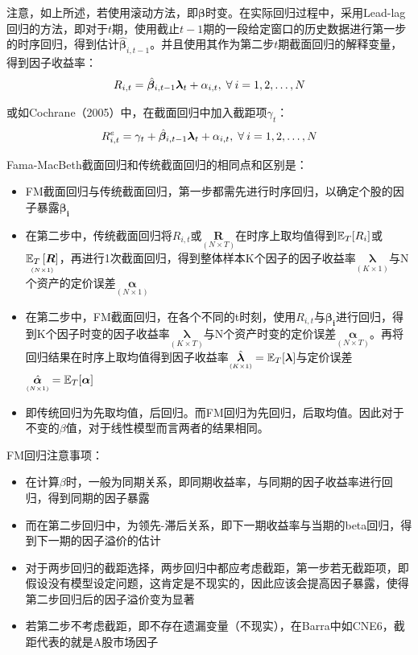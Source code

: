\documentclass[11pt]{article}
\begin{document}
注意，如上所述，若使用滚动方法，即$\bm{\beta}$时变。在实际回归过程中，采用Lead-lag回归的方法，即对于$t$期，使用截止$t-1$期的一段给定窗口的历史数据进行第一步的时序回归，得到估计$\hat{\bm{\beta}}_{i,t-1}$。并且使用其作为第二步$t$期截面回归的解释变量，得到因子收益率：
\begin{equation*}
    R_{i,t} = \hat{\bm{\beta}}_{i,t-1} \bm{\lambda}_t + \alpha_{i,t} \ilsep \forall i=1,2,\dots,N
\end{equation*}

或如Cochrane（2005）中，在截面回归中加入截距项$\gamma_t$：
\begin{equation*}
    R_{i,t}^{e} = \gamma_t + \hat{\bm{\beta}}_{i,t-1} \bm{\lambda}_t + \alpha_{i,t} \ilsep \forall i=1,2,\dots,N
\end{equation*}

Fama-MacBeth截面回归和传统截面回归的相同点和区别是：
\begin{itemize}
    \item FM截面回归与传统截面回归，第一步都需先进行时序回归，以确定个股的因子暴露$\bm{\beta_i}$
    \item 在第二步中，传统截面回归将$R_{i,t}$或$\underset{\scriptscriptstyle{(N \times T)}}{\bm{R}}$在时序上取均值得到$\mathbb{E}_T[R_i]$或$\underset{\scriptscriptstyle{(N \times 1)}}{\mathbb{E}_T\left[\bm{R}\right]}$，再进行1次截面回归，得到整体样本K个因子的因子收益率$\underset{\scriptscriptstyle{(K \times 1)}}{\bm{\lambda}}$与N个资产的定价误差$\underset{\scriptscriptstyle(N \times 1)}{\bm{\alpha}}$
    \item 在第二步中，FM截面回归，在各个不同的t时刻，使用$R_{i,t}$与$\bm{\beta_{i}}$进行回归，得到K个因子时变的因子收益率$\underset{\scriptscriptstyle{(K \times T)}}{\bm{\lambda}}$与N个资产时变的定价误差$\underset{\scriptscriptstyle(N \times T)}{\bm{\alpha}}$。再将回归结果在时序上取均值得到因子收益率$\underset{\scriptscriptstyle{(K \times 1)}}{\hat{\bm{\lambda}}} = \mathbb{E}_T[\bm{\lambda}]$与定价误差$\underset{\scriptscriptstyle{(N \times 1)}}{\hat{\bm{\alpha}}} = \mathbb{E}_T[\bm{\alpha}]$
    \item 即传统回归为先取均值，后回归。而FM回归为先回归，后取均值。因此对于不变的$\beta$值，对于线性模型而言两者的结果相同。
\end{itemize}

\begin{note}
    FM回归注意事项：
    \begin{itemize}
        \item 在计算$\beta$时，一般为同期关系，即同期收益率，与同期的因子收益率进行回归，得到同期的因子暴露
        \item 而在第二步回归中，为领先-滞后关系，即下一期收益率与当期的beta回归，得到下一期的因子溢价的估计
        \item 对于两步回归的截距选择，两步回归中都应考虑截距，第一步若无截距项，即假设没有模型设定问题，这肯定是不现实的，因此应该会提高因子暴露，使得第二步回归后的因子溢价变为显著
        \item 若第二步不考虑截距，即不存在遗漏变量（不现实），在Barra中如CNE6，截距代表的就是A股市场因子
    \end{itemize}
\end{note}
\end{document}
